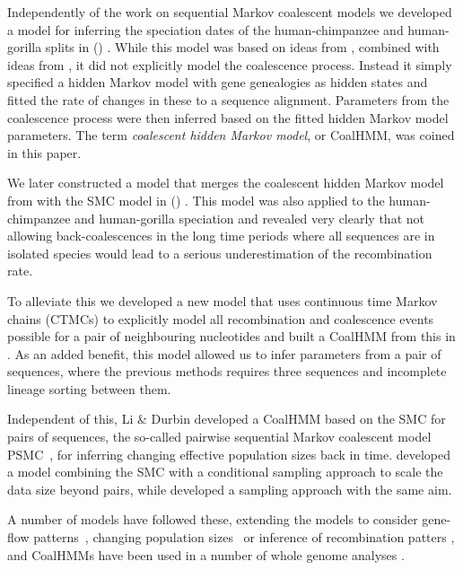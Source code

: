 Independently of the work on sequential Markov coalescent models we developed a model for inferring the speciation dates of the human-chimpanzee and human-gorilla splits in \citeauthor{Hobolth:2007gz} (\citeyear{Hobolth:2007gz}) \emph{} \citep{Hobolth:2007gz}. While this model was based on ideas from \citet{Wiuf:1999gu}, combined with ideas from \citet{Takahata1995Divergence-time}, it did not explicitly model the coalescence process. Instead it simply specified a hidden Markov model with gene genealogies as hidden states and fitted the rate of changes in these to a sequence alignment. Parameters from the coalescence process were then inferred based on the fitted hidden Markov model parameters. The term \emph{coalescent hidden Markov model}, or CoalHMM, was coined in this paper.

We later constructed a model that merges the coalescent hidden Markov model from \citet{Hobolth:2007gz} with the SMC model in \citeauthor{Dutheil:2009dt} (\citeyear{Dutheil:2009dt}) \emph{} \citep{Dutheil:2009dt}. This model was also applied to the human-chimpanzee and human-gorilla speciation and revealed very clearly that not allowing back-coalescences in the long time periods where all sequences are in isolated species would lead to a serious underestimation of the recombination rate.

To alleviate this we developed a new model that uses continuous time Markov chains (CTMCs) to explicitly model all recombination and coalescence events possible for a pair of neighbouring nucleotides and built a CoalHMM from this in \citet{Mailund:2011dv}. As an added benefit, this model allowed us to infer parameters from a pair of sequences, where the previous methods requires three sequences and incomplete lineage sorting between them.

Independent of this, Li \& Durbin developed a CoalHMM based on the SMC for pairs of sequences, the so-called pairwise sequential Markov coalescent model PSMC~\cite{Li:2011ez}, for inferring changing effective population sizes back in time. \citet{Paul:2011gv} developed a model combining the SMC with a conditional sampling approach to scale the data size beyond pairs, while \citet{Rasmussen:2014cq} developed a sampling approach with the same aim.

A number of models have followed these, extending the models to consider gene-flow patterns~\cite{Steinrucken:2013kb,Mailund:2012ew}, changing population sizes~\cite{Sheehan:2013ib,Schiffels:2014cu} or inference of recombination patters \cite{Munch:2014cb}, and CoalHMMs have been used in a number of whole genome analyses \cite{Locke:2011gn,Scally:2012ik,PradoMartinez:2013dn,Prufer:2012eaa,Miller:2012bx}.

